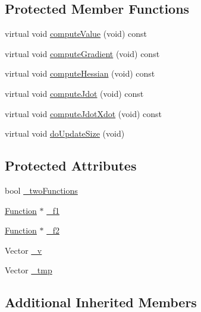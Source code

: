 \subsection*{Protected Member Functions}
\begin{DoxyCompactItemize}
\item 
virtual void \hyperlink{classocra_1_1DotProductFunction_ac0dcd9911e638ebcd8e9594dbf0fa9ed}{compute\+Value} (void) const
\item 
virtual void \hyperlink{classocra_1_1DotProductFunction_af088997b35bf792a1f1c9c6fb78c0fe1}{compute\+Gradient} (void) const
\item 
virtual void \hyperlink{classocra_1_1DotProductFunction_a97dcdd721c76f80cb20e257aca4f8a58}{compute\+Hessian} (void) const
\item 
virtual void \hyperlink{classocra_1_1DotProductFunction_a707474c43d42fad3a8c5bbd896ca8f4b}{compute\+Jdot} (void) const
\item 
virtual void \hyperlink{classocra_1_1DotProductFunction_a07f6a0a7e676a8849732f3469d70bcae}{compute\+Jdot\+Xdot} (void) const
\item 
virtual void \hyperlink{classocra_1_1DotProductFunction_af943f9e456e44b3cbe108a964697f239}{do\+Update\+Size} (void)
\end{DoxyCompactItemize}
\subsection*{Protected Attributes}
\begin{DoxyCompactItemize}
\item 
bool \hyperlink{classocra_1_1DotProductFunction_a8450996eff9607045cf57a4502ff0944}{\+\_\+two\+Functions}
\item 
\hyperlink{classocra_1_1Function}{Function} $\ast$ \hyperlink{classocra_1_1DotProductFunction_a3e39a9ce09fc27131afbe8e7a6758681}{\+\_\+f1}
\item 
\hyperlink{classocra_1_1Function}{Function} $\ast$ \hyperlink{classocra_1_1DotProductFunction_a7de350aefad539fdd84453b11019e936}{\+\_\+f2}
\item 
Vector \hyperlink{classocra_1_1DotProductFunction_a6405d1f78159e5fc16801bd73eb32a68}{\+\_\+v}
\item 
Vector \hyperlink{classocra_1_1DotProductFunction_a82d2cb16e4b9b6d50e59fabfb25fc222}{\+\_\+tmp}
\end{DoxyCompactItemize}
\subsection*{Additional Inherited Members}


